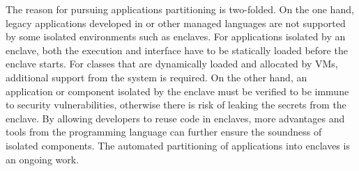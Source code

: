 The reason for pursuing \java{} applications partitioning
is two-folded.
On the one hand, legacy applications developed in \java{} or other managed languages
are not supported by
some isolated environments such as \intel{} \sgx{} enclaves.
For applications isolated by an enclave,
both the execution and interface have to be statically loaded
before the enclave starts.
For \java{} classes that are dynamically loaded and allocated by \java{} VMs,
additional support from the system is required.
On the other hand,
an application or component isolated by the enclave must be verified to
be immune to security vulnerabilities,
otherwise there is risk of leaking the secrets from the enclave.
By allowing developers to reuse \java{} code in enclaves{},
more advantages and tools from the programming language can further ensure the soundness of isolated components.
The automated partitioning of \java{} applications into enclaves
is an ongoing work.



%
%

